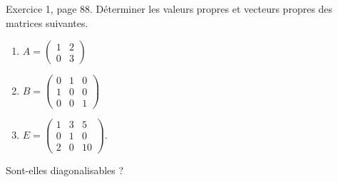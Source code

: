 \begin{exercice}\label{exoLineraire0032}

	Exercice 1, page 88. Déterminer les valeurs propres et vecteurs propres des matrices suivantes.
	\begin{enumerate}

		\item
			$A=\begin{pmatrix}
				1	&	2	\\ 
				0	&	3	
			\end{pmatrix}$

		\item
			$B=\begin{pmatrix}
				  0	&	1	&	0\\ 
				    1	&	0	&	0\\ 
				     0	&	0	& 1	  
			     \end{pmatrix}$

		\item
			$E=\begin{pmatrix}
				1	&	3	&	5\\ 
				0	&	1	&	0\\ 
				2	&	0	&	10	  
			\end{pmatrix}$.

	\end{enumerate}
	Sont-elles diagonalisables ?


\end{exercice}
